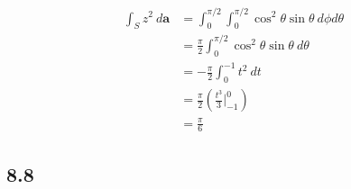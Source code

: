 \documentclass[10pt]{mypackage}
\begin{document}
\begin{enumerate}[(a)]
    \begin{align*}
      \int_{S}^{} z^2\:d\mathbf{a} &= \int_{0}^{\pi/2}\int_{0}^{\pi/2} \cos^2\theta \sin\theta\:d\phi d\theta\\
                                   &= \frac{\pi}{2}\int_{0}^{\pi/2} \cos^2\theta\sin\theta\:d\theta\\
                                   &= -\frac{\pi}{2}\int_{0}^{-1} t^2\:dt \tag*{$t = \cos\theta$}\\
                                   &= \frac{\pi}{2}\left(\frac{t^3}{3}\bigr\vert_{-1}^{0}\right)\\
                                   &= \frac{\pi}{6}
    \end{align*}
\end{enumerate}
\subsection{8.8}%
\end{document}
